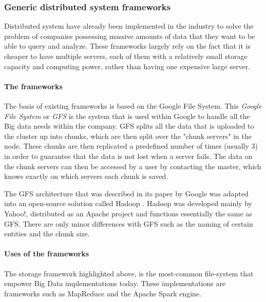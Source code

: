 \subsubsection{Generic distributed system frameworks}
Distributed system have already been implemented in the industry to solve the problem of companies possessing massive amounts of data that they want to be able to query and analyze. These frameworks largely rely on the fact that it is cheaper
to have multiple servers, each of them with a relatively small storage capacity and computing power, rather than having one expensive large server.

\paragraph{The frameworks}
The basis of existing frameworks is based on the Google File System\cite{Ghem03}. This \textit{Google File System} or \textit{GFS} is the system that is used within Google to handle all the Big data needs within the company. GFS splits all the data that is uploaded to the cluster up into chunks, which are then split over the "chunk servers" in the node. These chunks are then replicated a predefined number of times (usually 3) in order to guarantee that the data is not lost when a server fails. The data on the chunk servers can then be accessed by a user by contacting the master, which knows exactly on which servers each chunk is saved.\cite{Ghem03}

The GFS architecture that was described in its paper by Google was adapted into an open-source solution called Hadoop \cite{Shv10}. Hadoop was developed mainly by Yahoo!, distributed as an Apache project and functions essentially the same as GFS. There are only minor differences with GFS such as the naming of certain entities and the chunk size.

\paragraph{Uses of the frameworks}
The storage framework highlighted above, is the most-common file-system that empower Big Data implementations today. These implementations are frameworks such as MapReduce and the Apache Spark engine.

